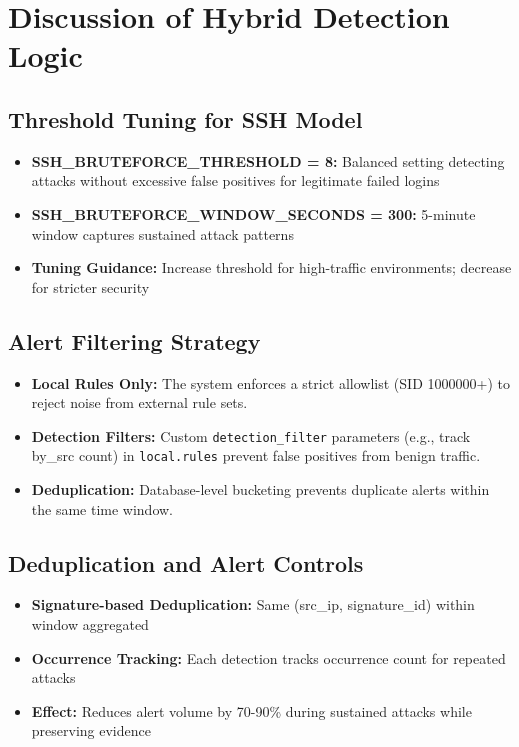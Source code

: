 \documentclass[12pt,a4paper]{report} %
\begin{document}
\section{Discussion of Hybrid Detection Logic}
\label{sec:hybrid-discussion}

\subsection{Threshold Tuning for SSH Model}
\begin{itemize}
	\item \textbf{SSH\_BRUTEFORCE\_THRESHOLD = 8:} Balanced setting detecting attacks without excessive false positives for legitimate failed logins
	\item \textbf{SSH\_BRUTEFORCE\_WINDOW\_SECONDS = 300:} 5-minute window captures sustained attack patterns
	\item \textbf{Tuning Guidance:} Increase threshold for high-traffic environments; decrease for stricter security
\end{itemize}

\subsection{Alert Filtering Strategy}
\begin{itemize}
	\item \textbf{Local Rules Only:} The system enforces a strict allowlist (SID 1000000+) to reject noise from external rule sets.
	\item \textbf{Detection Filters:} Custom \texttt{detection\_filter} parameters (e.g., track by\_src count) in \texttt{local.rules} prevent false positives from benign traffic.
	\item \textbf{Deduplication:} Database-level bucketing prevents duplicate alerts within the same time window.
\end{itemize}

\subsection{Deduplication and Alert Controls}
\begin{itemize}
	\item \textbf{Signature-based Deduplication:} Same (src\_ip, signature\_id) within window aggregated
	\item \textbf{Occurrence Tracking:} Each detection tracks occurrence count for repeated attacks
	\item \textbf{Effect:} Reduces alert volume by 70-90\% during sustained attacks while preserving evidence
\end{itemize}
\end{document}
